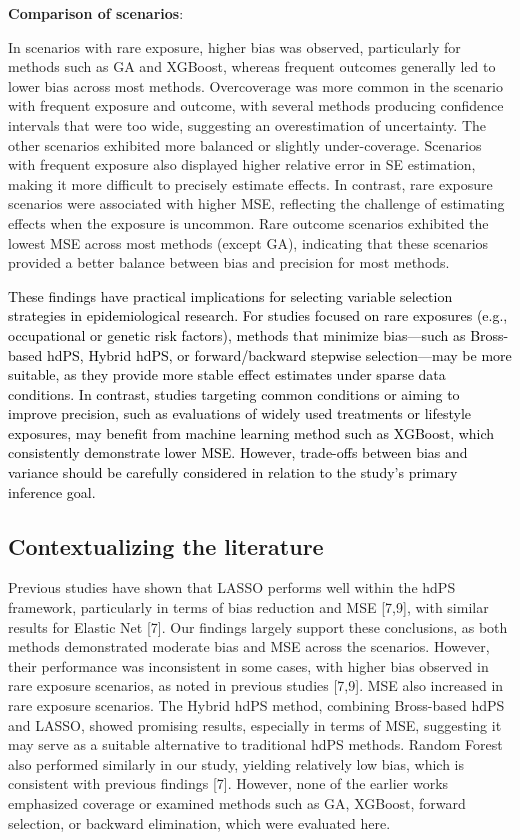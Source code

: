 \documentclass[10pt,letterpaper]{article}
\begin{document}
\textbf{Comparison of scenarios}:

In scenarios with rare exposure, higher bias was observed, particularly
for methods such as GA and XGBoost, whereas frequent outcomes generally
led to lower bias across most methods. Overcoverage was more common in
the scenario with frequent exposure and outcome, with several methods
producing confidence intervals that were too wide, suggesting an
overestimation of uncertainty. The other scenarios exhibited more
balanced or slightly under-coverage. Scenarios with frequent exposure
also displayed higher relative error in SE estimation, making it more
difficult to precisely estimate effects. In contrast, rare exposure
scenarios were associated with higher MSE, reflecting the challenge of
estimating effects when the exposure is uncommon. Rare outcome scenarios
exhibited the lowest MSE across most methods (except GA), indicating
that these scenarios provided a better balance between bias and
precision for most methods.

\textcolor{black}{These findings have practical implications for selecting variable selection strategies in epidemiological research. For studies focused on rare exposures (e.g., occupational or genetic risk factors), methods that minimize bias—such as Bross-based hdPS, Hybrid hdPS, or forward/backward stepwise selection—may be more suitable, as they provide more stable effect estimates under sparse data conditions. In contrast, studies targeting common conditions or aiming to improve precision, such as evaluations of widely used treatments or lifestyle exposures, may benefit from machine learning method such as XGBoost, which consistently demonstrate lower MSE. However, trade-offs between bias and variance should be carefully considered in relation to the study’s primary inference goal.}

\subsection{Contextualizing the
literature}\label{contextualizing-the-literature}

Previous studies have shown that LASSO performs well within the hdPS
framework, particularly in terms of bias reduction and MSE {[}7,9{]},
with similar results for Elastic Net {[}7{]}. Our findings largely
support these conclusions, as both methods demonstrated moderate bias
and MSE across the scenarios. However, their performance was
inconsistent in some cases, with higher bias observed in rare exposure
scenarios, as noted in previous studies {[}7,9{]}. MSE also increased in
rare exposure scenarios. The Hybrid hdPS method, combining Bross-based
hdPS and LASSO, showed promising results, especially in terms of MSE,
suggesting it may serve as a suitable alternative to traditional hdPS
methods. Random Forest also performed similarly in our study, yielding
relatively low bias, which is consistent with previous findings {[}7{]}.
However, none of the earlier works emphasized coverage or examined
methods such as GA, XGBoost, forward selection, or backward elimination,
which were evaluated here.
\end{document}
